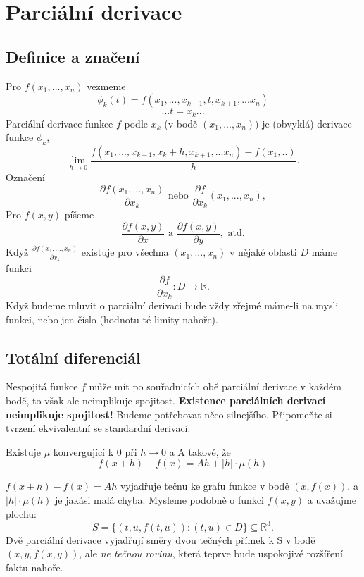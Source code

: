 \documentclass[../main.tex]{subfiles}
\begin{document}
\section{Parciální derivace}

\subsection{Definice a značení}
\begin{definition}
	Pro $f(x_1,...,x_n)$ vezmeme 
	\[\phi_k(t) = f(x_1,...,x_{k-1},t,x_{k+1},...x_n)\]
	\[... t = x_k...\]
	Parciální derivace funkce $f$ podle $x_k$ (v bodě $(x_1,...,x_n))$ je (obvyklá) derivace funkce $\phi_k$,
	\[\lim_{h\rightarrow 0}\frac{f(x_1,...,x_{k-1},x_k+h,x_{k+1},...x_n) - f(x_1,..)}{h}.\]
	Označení
	\[\frac{\partial f(x_1,...,x_n)}{\partial x_k} \textrm{ nebo } \frac{\partial f}{\partial x_k} (x_1,...,x_n),\]
	Pro $f(x,y)$ píšeme
	\[\frac{\partial f(x,y)}{\partial x} \textrm{ a } \frac{\partial f(x,y)}{\partial y}, \textrm{ atd.}\]
	Když $\frac{\partial f(x_1,...,x_n)}{\partial x_k}$ existuje pro všechna $(x_1,...,x_n)$ v nějaké oblasti $D$ máme funkci
	\[\frac{\partial f}{\partial x_k}: D \rightarrow \mathbb{R}.\]
	Když budeme mluvit o parciální derivaci bude vždy zřejmé máme-li na mysli funkci, nebo jen číslo (hodnotu té limity nahoře).
\end{definition}

\subsection{Totální diferenciál}
Nespojitá funkce $f$ může mít po souřadnicích obě parciální derivace v každém bodě, to však ale neimplikuje spojitost. \textbf{Existence parciálních derivací neimplikuje spojitost!}
Budeme potřebovat něco silnejšího. Připomeňte si tvrzení ekvivalentní se standardní derivací:

\begin{lemma}[Derivace]
	Existuje $\mu$ konvergující k 0 při $h \rightarrow 0$ a A takové, že 
	\[f(x+h) - f(x) = Ah + |h| \cdot \mu(h)\]
\end{lemma}

\begin{intuition}
	$f(x+h) - f(x) = Ah$ vyjadřuje tečnu ke grafu funkce v bodě $(x,f(x)).$ a $|h|\cdot \mu(h)$ je jakási malá chyba.
	Mysleme podobně o funkci $f(x,y)$ a uvažujme plochu:
	\[S = \{(t,u,f(t,u)) : (t,u) \in D\} \subseteq \mathbb{R}^3.\]
	Dvě parciální derivace vyjadřují směry dvou tečných přímek k S v bodě $(x,y,f(x,y))$, ale \textit{ne tečnou rovinu},
	která teprve bude uspokojivé rozšíření faktu nahoře.
\end{intuition}
\end{document}
